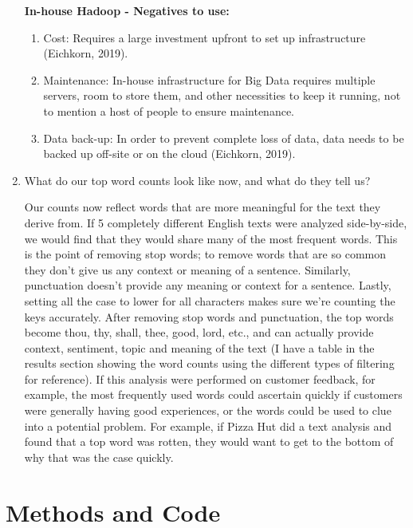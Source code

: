 \documentclass[]{article}
\begin{document}
\begin{enumerate}
	\textbf{In-house Hadoop - Negatives to use:}
	
	\begin{enumerate}
		\item Cost: Requires a large investment upfront to set up infrastructure (Eichkorn, 2019).
		\item Maintenance: In-house infrastructure for Big Data requires multiple servers, room to store them, and other necessities to keep it running, not to mention a host of people to ensure maintenance.
		\item Data back-up: In order to prevent complete loss of data, data needs to be backed up off-site or on the cloud (Eichkorn, 2019).
	\end{enumerate}
	
	\item What do our top word counts look like now, and what do they tell us?
	
	Our counts now reflect words that are more meaningful for the text they derive from.  If 5 completely different English texts were analyzed side-by-side, we would find that they would share many of the most frequent words.  This is the point of removing stop words; to remove words that are so common they don't give us any context or meaning of a sentence.  Similarly, punctuation doesn't provide any meaning or context for a sentence.  Lastly, setting all the case to lower for all characters makes sure we're counting the keys accurately.  After removing stop words and punctuation, the top words become thou, thy, shall, thee, good, lord, etc., and can actually provide context, sentiment, topic and meaning of the text (I have a table in the results section showing the word counts using the different types of filtering for reference).  If this analysis were performed on customer feedback, for example, the most frequently used words could ascertain quickly if customers were generally having good experiences, or the words could be used to clue into a potential problem.  For example, if Pizza Hut did a text analysis and found that a top word was rotten, they would want to get to the bottom of why that was the case quickly.  
	
\end{enumerate}

\section{Methods and Code}
\end{document}
